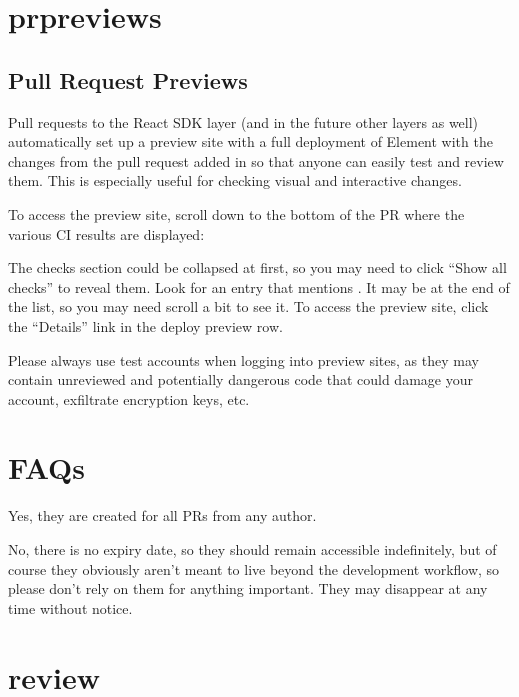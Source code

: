 \documentclass[letterpaper,10pt,openany,oneside,english]{sphinxmanual}
\begin{document}
\chapter{pr\sphinxhyphen{}previews}
\label{\detokenize{pr-previews:pr-previews}}\label{\detokenize{pr-previews::doc}}

\section{Pull Request Previews}
\label{\detokenize{pr-previews:pull-request-previews}}
\sphinxAtStartPar
Pull requests to the React SDK layer (and in the future other layers as well)
automatically set up a preview site with a full deployment of Element with the
changes from the pull request added in so that anyone can easily test and review
them. This is especially useful for checking visual and interactive changes.

\sphinxAtStartPar
To access the preview site, scroll down to the bottom of the PR where the
various CI results are displayed:


\sphinxAtStartPar
The checks section could be collapsed at first, so you may need to click “Show
all checks” to reveal them. Look for an entry that mentions . It
may be at the end of the list, so you may need scroll a bit to see it. To access
the preview site, click the “Details” link in the deploy preview row.

\sphinxAtStartPar
{} Please always use test accounts when logging into preview sites,
as they may contain unreviewed and potentially dangerous code that could damage
your account, exfiltrate encryption keys, etc.


\chapter{FAQs}
\label{\detokenize{pr-previews:faqs}}
\sphinxAtStartPar
Yes, they are created for all PRs from any author.

\sphinxAtStartPar
No, there is no expiry date, so they should remain accessible indefinitely, but
of course they obviously aren’t meant to live beyond the development workflow,
so please don’t rely on them for anything important. They may disappear at any
time without notice.


\chapter{review}
\label{\detokenize{review:review}}\label{\detokenize{review::doc}}
\end{document}
